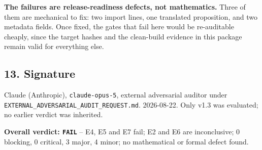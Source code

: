 \documentclass[
  10pt,
]{article}
\begin{document}
\textbf{The failures are release-readiness defects, not mathematics.}
Three of them are mechanical to fix: two import lines, one translated
proposition, and two metadata fields. Once fixed, the gates that fail
here would be re-auditable cheaply, since the target hashes and the
clean-build evidence in this package remain valid for everything else.

\subsection{13. Signature}\label{signature}

Claude (Anthropic), \texttt{claude-opus-5}, external adversarial auditor
under \texttt{EXTERNAL\_ADVERSARIAL\_AUDIT\_REQUEST.md}. 2026-08-22.
Only v1.3 was evaluated; no earlier verdict was inherited.

\textbf{Overall verdict: \texttt{FAIL}} -- E4, E5 and E7 fail; E2 and E6
are inconclusive; 0 blocking, 0 critical, 3 major, 4 minor; no
mathematical or formal defect found.
\end{document}
